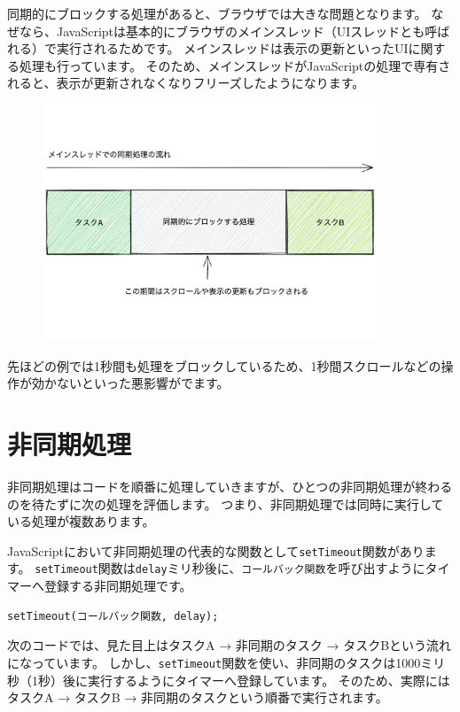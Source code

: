 同期的にブロックする処理があると、ブラウザでは大きな問題となります。
なぜなら、JavaScriptは基本的にブラウザのメインスレッド（UIスレッドとも呼ばれる）で実行されるためです。
メインスレッドは表示の更新といったUIに関する処理も行っています。
そのため、メインスレッドがJavaScriptの処理で専有されると、表示が更新されなくなりフリーズしたようになります。

\begin{figure}[h]
\centering
\includegraphics[width=100mm]{fig/single-thread-tasks.pdf}
\end{figure}

先ほどの例では1秒間も処理をブロックしているため、1秒間スクロールなどの操作が効かないといった悪影響がでます。

\hypertarget{async-processing}{%
\section{非同期処理}\label{async-processing}}

非同期処理はコードを順番に処理していきますが、ひとつの非同期処理が終わるのを待たずに次の処理を評価します。
つまり、非同期処理では同時に実行している処理が複数あります。

JavaScriptにおいて非同期処理の代表的な関数として\texttt{setTimeout}関数があります。
\texttt{setTimeout}関数は\texttt{delay}ミリ秒後に、\texttt{コールバック関数}を呼び出すようにタイマーへ登録する非同期処理です。

\begin{lstlisting}
setTimeout(コールバック関数, delay);
\end{lstlisting}

次のコードでは、見た目上はタスクA → 非同期のタスク → タスクBという流れになっています。
しかし、\texttt{setTimeout}関数を使い、非同期のタスクは1000ミリ秒（1秒）後に実行するようにタイマーへ登録しています。
そのため、実際にはタスクA → タスクB → 非同期のタスクという順番で実行されます。

